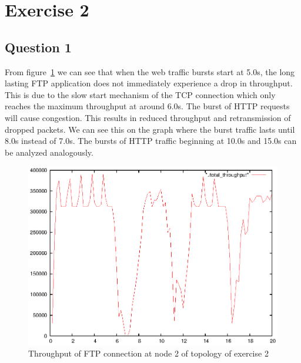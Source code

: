 \documentclass[a4paper]{report}
\begin{document}
\chapter*{Exercise 2}

\section*{Question 1}
From figure~\ref{ex2:question1} we can see that when the web traffic bursts start at 5.0s, the long lasting FTP application does not immediately experience a drop in throughput. This is due to the slow start mechanism of the TCP connection which only reaches the maximum throughput at around 6.0s. The burst of HTTP requests will cause congestion. This results in reduced throughput and retransmission of dropped packets. We can see this on the graph where the burst traffic lasts until 8.0s instead of 7.0s. The bursts of HTTP traffic beginning at 10.0s and 15.0s can be analyzed analogously.
\begin{figure}[h]
\centerline{\includegraphics{pictures/E2Q1.eps}}
\caption{Throughput of FTP connection at node 2 of topology of exercise 2}
\label{ex2:question1}
\end{figure}
\end{document}
